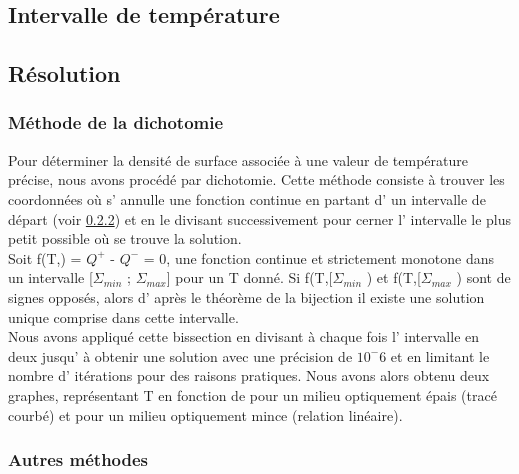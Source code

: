 \subsection{Intervalle de température}

\subsection{Résolution}
\subsubsection{Méthode de la dichotomie}

Pour déterminer la densité de surface associée à une valeur de température précise, nous avons procédé par dichotomie.
Cette méthode consiste à trouver les coordonnées où s' annulle une fonction continue en partant d' un intervalle de départ (voir \ref{}) et en le divisant successivement pour cerner l' intervalle le plus petit possible où se trouve la solution.  
\\
Soit f(T,\Sigma) = $Q^+$ - $Q^-$ = 0,  une fonction continue et strictement monotone dans un intervalle [$\Sigma_{min}$ ; $\Sigma_{max}$] pour un T donné. Si f(T,[$\Sigma_{min}$ ) et  f(T,[$\Sigma_{max}$ ) sont de signes opposés, alors d' après le théorème de la bijection il existe une solution unique comprise dans cette intervalle. 
\\
Nous avons appliqué cette bissection en divisant à chaque fois l' intervalle en deux jusqu' à obtenir une solution avec une précision de $10^-6$ et en limitant le nombre d' itérations pour des raisons pratiques. Nous avons alors obtenu deux graphes, représentant T en fonction de \Sigma pour un milieu optiquement épais (tracé courbé) et pour un milieu optiquement mince (relation linéaire).
\\
[deux graphes log T-logS]

\subsubsection{Autres méthodes}

